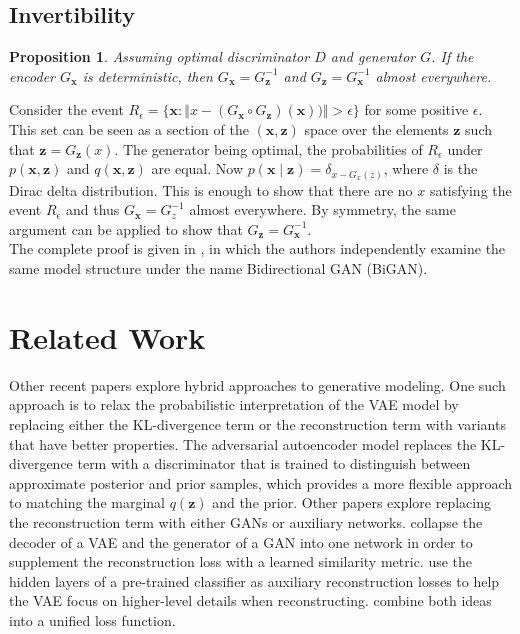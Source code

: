 \documentclass{article}
\newtheorem{prop}{Proposition}
\newenvironment{sketchproof}{%
  \renewcommand{\proofname}{Sketch of proof}\proof}{\endproof}
\begin{document}
\subsection{Invertibility}
\label{sec:invertibility}
\begin{prop}
    Assuming optimal discriminator $D$ and generator $G$. If the encoder
    $G_{\bm{x}}$ is deterministic, then $G_{\bm{x}} = G^{-1}_{\bm{z}}$ and
    $G_{\bm{z}} = G^{-1}_{\bm{x}}$ almost everywhere.
\end{prop}
\begin{sketchproof}
    Consider the event $R_{\epsilon} = \{\bm{x} : \Vert x - (G_{\bm{x}} \circ
    G_{\bm{z}})(\bm{x})) \Vert > \epsilon\}$ for some positive $\epsilon$. This
    set can be seen as a section of the $(\bm{x}, \bm{z})$ space 	over the
    elements $\bm{z}$ such that $\bm{z} = G_{\bm{z}}(x)$. The generator being
    optimal, the probabilities of $R_{\epsilon}$ under $p(\bm{x}, \bm{z})$ and
    $q(\bm{x}, \bm{z})$ are equal.  Now $p(\bm{x} \mid \bm{z}) = \delta_{x -
    G_{x}(z)}$, where $\delta$ is the Dirac delta distribution.  This is enough
    to show that there are no $x$ satisfying the event $R_{\epsilon}$ and thus
    $G_{\bm{x}} = G^{-1}_{z}$ almost everywhere.  By symmetry, the same argument
    can be applied to show that $G_{\bm{z}} = G^{-1}_{\bm{x}}$. \\ The complete
    proof is given in \citep{donahue2016adversarial}, in which the authors
    independently examine the same model structure under the name Bidirectional
    GAN (BiGAN).
\end{sketchproof}

\section{Related Work}

Other recent papers explore hybrid approaches to generative modeling. One such
approach is to relax the probabilistic interpretation of the VAE model by
replacing either the KL-divergence term or the reconstruction term with
variants that have better properties. The adversarial autoencoder model
\citep{makhzani2015adversarial} replaces the KL-divergence term with a
discriminator that is trained to distinguish between approximate posterior and
prior samples, which provides a more flexible approach to matching the marginal
$q(\bm{z})$ and the prior. Other papers explore replacing the reconstruction
term with either GANs or auxiliary networks. \citet{larsen2015autoencoding}
collapse the decoder of a VAE and the generator of a GAN into one network in
order to supplement the reconstruction loss with a learned similarity metric.
\citet{lamb2016discriminative} use the hidden layers of a pre-trained
classifier as auxiliary reconstruction losses to help the VAE focus on
higher-level details when reconstructing. \citet{dosovitskiy2016generating}
combine both ideas into a unified loss function.
\end{document}
